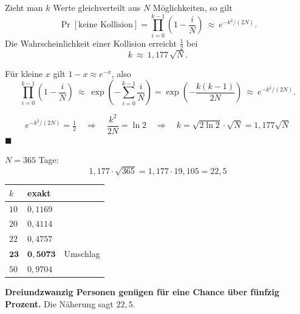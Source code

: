 \begin{merksatz}
Zieht man $k$ Werte gleichverteilt aus $N$ Möglichkeiten, so gilt
\[ \Pr[\text{keine Kollision}] = \prod_{i=0}^{k-1}\left(1-\frac{i}{N}\right) \ \approx\ e^{-k^{2}/(2N)} . \]
Die Wahrscheinlichkeit einer Kollision erreicht $\frac12$ bei
\[ k \ \approx\ 1{,}177\,\sqrt{N} . \]

Für kleine $x$ gilt $1-x \approx e^{-x}$, also
\[ \prod_{i=0}^{k-1}\left(1-\frac iN\right) \ \approx\ \exp\left(-\sum_{i=0}^{k-1}\frac iN\right) = \exp\left(-\frac{k(k-1)}{2N}\right) \ \approx\ e^{-k^{2}/(2N)} . \]

\[ e^{-k^{2}/(2N)} = \tfrac12 \quad\Longrightarrow\quad \frac{k^{2}}{2N} = \ln 2 \quad\Longrightarrow\quad k = \sqrt{2\ln 2}\cdot\sqrt N = 1{,}177\sqrt N \]
$\blacksquare$

$N = 365$ Tage:
\[ 1{,}177\cdot\sqrt{365} = 1{,}177\cdot19{,}105 = 22{,}5 \]

\begin{center}
{\small
\renewcommand{\arraystretch}{1.48}
\begin{tabular}{@{}P{1.6cm}P{2.4cm}P{2.4cm}@{}}
\toprule
$k$ & \textbf{exakt} & \\
\midrule
$10$ & $0{,}1169$ & \\
$20$ & $0{,}4114$ & \\
$22$ & $0{,}4757$ & \\
$\mathbf{23}$ & $\mathbf{0{,}5073}$ & \textcolor{akzent}{Umschlag}\\
$50$ & $0{,}9704$ & \\
\bottomrule
\end{tabular}}
\end{center}

\begin{center}
\begin{minipage}{0.9\textwidth}
\textbf{Dreiundzwanzig Personen genügen für eine Chance über fünfzig Prozent.} Die Näherung sagt $22{,}5$.
\end{minipage}
\end{center}
\end{merksatz}

